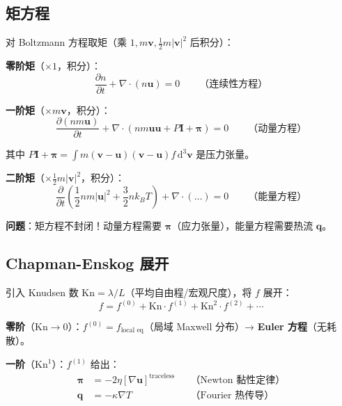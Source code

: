 \documentclass[11pt,a4paper]{article}
\newcommand{\vi}{\mathbf{v}}
\begin{document}
\subsection{矩方程}

对 Boltzmann 方程取矩（乘 $1, m\vi, \frac{1}{2}m|\vi|^2$ 后积分）：

\textbf{零阶矩}（$\times 1$，积分）：
\begin{equation}
\frac{\partial n}{\partial t} + \nabla\cdot(n\mathbf{u}) = 0 \qquad \text{（连续性方程）}
\end{equation}

\textbf{一阶矩}（$\times m\vi$，积分）：
\begin{equation}
\frac{\partial(nm\mathbf{u})}{\partial t} + \nabla\cdot(nm\mathbf{u}\mathbf{u} + P\mathbf{I} + \boldsymbol{\pi}) = 0 \qquad \text{（动量方程）}
\end{equation}

其中 $P\mathbf{I} + \boldsymbol{\pi} = \int m(\vi-\mathbf{u})(\vi-\mathbf{u})f\,\mathrm{d}^3\vi$ 是压力张量。

\textbf{二阶矩}（$\times \frac{1}{2}m|\vi|^2$，积分）：
\begin{equation}
\frac{\partial}{\partial t}\left(\frac{1}{2}nm|\mathbf{u}|^2 + \frac{3}{2}nk_BT\right) + \nabla\cdot(\ldots) = 0 \qquad \text{（能量方程）}
\end{equation}

\textbf{问题}：矩方程不封闭！动量方程需要 $\boldsymbol{\pi}$（应力张量），能量方程需要热流 $\mathbf{q}$。

\subsection{Chapman-Enskog 展开}

引入 Knudsen 数 $\text{Kn} = \lambda/L$（平均自由程/宏观尺度），将 $f$ 展开：
\begin{equation}
f = f^{(0)} + \text{Kn}\cdot f^{(1)} + \text{Kn}^2\cdot f^{(2)} + \cdots
\end{equation}

\textbf{零阶}（$\text{Kn}\to 0$）：$f^{(0)} = f_{\text{local eq}}$（局域 Maxwell 分布）→ \textbf{Euler 方程}（无耗散）。

\textbf{一阶}（$\text{Kn}^1$）：$f^{(1)}$ 给出：
\begin{align}
\boldsymbol{\pi} &= -2\eta\left[\nabla\mathbf{u}\right]^{\text{traceless}} & &\text{（Newton 黏性定律）}\\
\mathbf{q} &= -\kappa\nabla T & &\text{（Fourier 热传导）}
\end{align}
\end{document}
